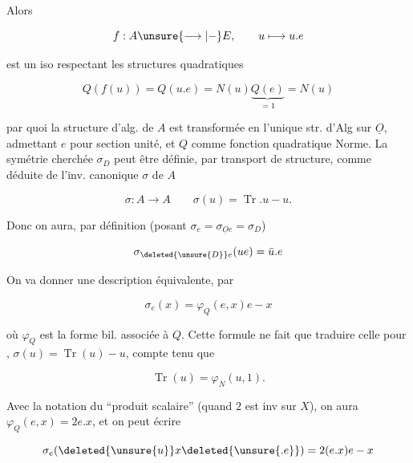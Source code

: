 
Alors

\[
f: A\unsure{\longrightarrow|\mathbin{-}} E,\qquad u\longmapsto u.e
\]

est un iso respectant les structures quadratiques

\[
Q(f(u))=Q(u.e)=N(u)\underbrace{Q(e)}_{=1}=N(u)
\]


par quoi la structure d'alg. de $A$ est transformée en l'unique str. d'Alg  sur $\underline O$, admettant $e$ pour section unité, et $Q$ comme fonction quadratique Norme. La symétrie cherchée $\sigma_D$ peut être définie, par transport de structure, comme déduite de l'inv. canonique $\sigma$ de $A$

\[
\sigma:A\longrightarrow A\qquad \sigma(u)=\operatorname{Tr}.u-u.
\]

Donc on aura, par définition (posant $\sigma_e=\sigma_{\underline Oe}=\sigma_D$)

\[
\sigma_{\deleted{\unsure{D}}e}(ue)=\bar u.e
\]

On va donner une description équivalente, par

\[
\sigma_e(x)=\varphi_Q(e,x)e-x
\]

où $\varphi_Q$ est la forme bil.  associée à $Q$. Cette formule ne fait que traduire celle pour , $\sigma(u)=\operatorname{Tr}(u)-u$, compte tenu que \unsure{$\{$}

\[
\operatorname{Tr}(u)=\varphi_N(u,1).
\]

Avec la notation du ``produit scalaire'' (quand $2$ est inv sur $X$), on aura $\varphi_Q(e,x)=2e.x$, et on peut écrire

\[
\sigma_e(\deleted{\unsure{u}}x\deleted{\unsure{.e}})=2(e.x)e-x
\]

